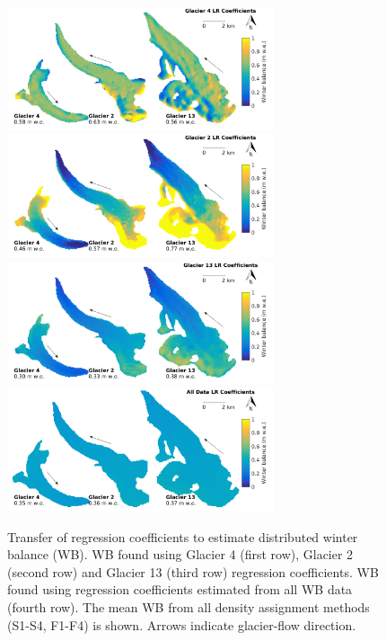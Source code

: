 \documentclass{sfuthesis}
\begin{document}
{\begin{figure}[H]
	\centering
	\includegraphics[width =0.7\textwidth]{MapTransferabilityG4Coeffs.png}\\
	\includegraphics[width =0.7\textwidth]{MapTransferabilityG2Coeffs.png}\\
	\includegraphics[width =0.7\textwidth]{MapTransferabilityG13Coeffs.png}\\	
	\includegraphics[width =0.7\textwidth]{MapTransferabilityComboCoeffs.png}\\
	\caption[Transfer of regression coefficients to estimate distributed winter balance]{Transfer of regression coefficients to estimate distributed winter balance (WB). WB found using Glacier 4 (first row), Glacier 2 (second row) and Glacier 13 (third row) regression coefficients. WB found using regression coefficients estimated from all WB data (fourth row). The mean WB from all density assignment methods (S1-S4, F1-F4) is shown. Arrows indicate glacier-flow direction.}
	\label{fig:MapTransferabilityGlaciersMean}
\end{figure}

}
\end{document}
